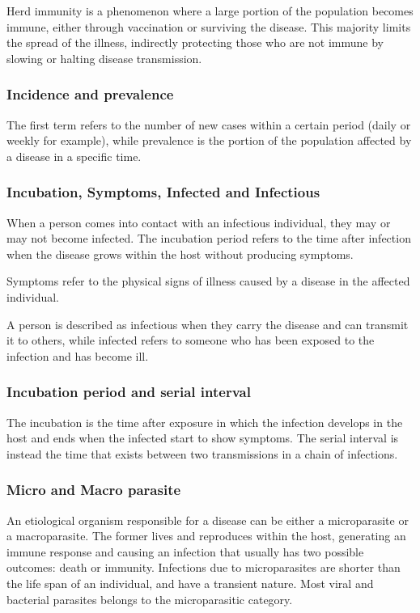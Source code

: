 Herd immunity is a phenomenon where a large portion of the population becomes immune, either through vaccination or surviving the disease. This majority limits the spread of the illness, indirectly protecting those who are not immune by slowing or halting disease transmission.

\subsubsection{Incidence and prevalence} The first term refers to the number of new cases within a certain period (daily or weekly for example), while prevalence is the portion of the population affected by a disease in a specific time.

\subsubsection{Incubation, Symptoms, Infected and Infectious}  When a person comes into contact with an infectious individual, they may or may not become infected. The incubation period refers to the time after infection when the disease grows within the host without producing symptoms.

Symptoms refer to the physical signs of illness caused by a disease in the affected individual.

A person is described as infectious when they carry the disease and can transmit it to others, while infected refers to someone who has been exposed to the infection and has become ill.

\subsubsection{Incubation period and serial interval} The incubation is the time after exposure in which the infection develops in the host and ends when the infected start to show symptoms. The serial interval is instead the time that exists between two transmissions in a chain of infections. 


\subsubsection{Micro and Macro parasite}
An etiological organism responsible for a disease can be either a  microparasite or a macroparasite. The former lives and reproduces within the host, generating an immune response and causing an infection that usually has two possible outcomes: death or immunity. Infections due to microparasites are shorter than the life span of an individual, and have a transient nature. Most viral and bacterial parasites belongs to the microparasitic category.

